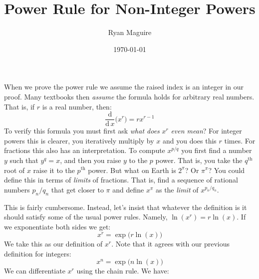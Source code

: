 \documentclass{article}
\title{Power Rule for Non-Integer Powers}
\author{Ryan Maguire}
\date{\today}
\theoremstyle{plain}
\begin{document}
    \maketitle
    When we prove the power rule we assume the raised index is an integer in our
    proof. Many textbooks then \textit{assume} the formula holds for arbitrary
    real numbers. That is, if $r$ is a real number, then:
    \begin{equation}
        \frac{\textrm{d}}{\textrm{d}\,x}\big(x^{r}\big)=rx^{r-1}
    \end{equation}
    To verify this formula you must first ask
    \textit{what does} $x^{r}$ \textit{even mean}? For integer powers this is
    clearer, you iteratively multiply by $x$ and you does this $r$ times.
    For fractions this also has an interpretation. To compute $x^{p/q}$ you
    first find a number $y$ such that $y^{q}=x$, and then you raise $y$ to the
    $p$ power. That is, you take the $q^{\textrm{th}}$ root of $x$ raise it to
    the $p^{\textrm{th}}$ power. But what on Earth is $2^{\pi}$? Or
    $\pi^{\pi}$? You could define this in terms of \textit{limits} of fractions.
    That is, find a sequence of rational numbers $p_{n}/q_{n}$ that get closer
    to $\pi$ and define $x^{\pi}$ as the \textit{limit} of $x^{p_{n}/q_{n}}$.
    \par\hfill\par
    This is fairly cumbersome. Instead, let's insist that whatever the
    definition is it should satisfy some of the usual power rules. Namely,
    $\ln(x^{r})=r\ln(x)$. If we exponentiate both sides we get:
    \begin{equation}
        x^{r}=\exp\big(r\ln(x)\big)
    \end{equation}
    We take this as our definition of $x^{r}$. Note that it agrees with our
    previous definition for integers:
    \begin{equation}
        x^{n}=\exp\big(n\ln(x)\big)
    \end{equation}
    We can differentiate $x^{r}$
    using the chain rule. We have:
\end{document}
